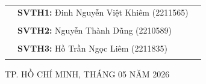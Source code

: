 \documentclass[a4paper]{article}
\theoremstyle{definition}
\begin{document}
\begin{titlepage}
\begin{table}[h]
\begin{tabular}{rll}
\\
\hspace{6 cm} &   \textbf{\Large SVTH1:} {\Large Đinh Nguyễn Việt Khiêm (2211565)}
\\
\\
\hspace{6 cm}&   \textbf{\Large SVTH2:}  {\Large Nguyễn Thành Dũng (2210589)}
\\
\\
\hspace{6 cm} &   \textbf{\Large SVTH3:}  {\Large Hồ Trần Ngọc Liêm (2211835)}
\\
\\
\end{tabular}
\end{table}
\vspace{0.5cm}
\begin{center}
{\Large TP. HỒ CHÍ MINH, THÁNG 05 NĂM 2026 }
\end{center}
\end{titlepage}
\newpage
\newpage
\tableofcontents
\newpage

\cleardoublepage
{}
{} %
\listoffigures
\newpage

\cleardoublepage
{}
{} %
\listoftables
\newpage



\newpage

\newpage

\newpage

\newpage

\newpage

\newpage

\newpage

\newpage

\newpage
%
\newpage
%
\newpage
%
\newpage

\newpage

\newpage

\newpage

\newpage

% 
\end{document}
